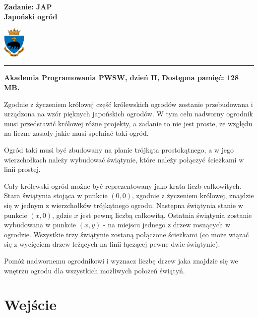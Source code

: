 \documentclass[10pt]{article}
\begin{document}
    

    \noindent
    \begin{minipage}{0.5\textwidth}
        \LARGE{\textsf{\textbf{Zadanie: JAP\\Japoński ogród}}}
    \end{minipage}
    \begin{minipage}{0.5\textwidth}
        \begin{flushright}
            \includegraphics[height=1.5cm]{logo.jpg}
        \end{flushright}
    \end{minipage}
    
    \noindent\rule{\textwidth}{0.4pt}
    
    \noindent\textbf{Akademia Programowania PWSW, dzień II, Dostępna pamięć: 128 MB.}
    \vspace{1em}
    
    
    \noindent
    Zgodnie z życzeniem królowej część królewskich ogrodów zostanie przebudowana i urządzona na wzór pięknych japońskich ogrodów. W tym celu nadworny ogrodnik musi przedstawić królowej różne projekty, a zadanie to nie jest proste, ze względu na liczne zasady jakie musi spełniać taki ogród. 
    
    Ogród taki musi być zbudowany na planie trójkąta prostokątnego, a w jego wierzchołkach należy wybudować świątynie, które należy połączyć ścieżkami w linii prostej.
    
    Cały królewski ogród możne być reprezentowany jako krata liczb całkowitych. Stara świątynia stojąca w punkcie $(0, 0)$, zgodnie z życzeniem królowej, znajdzie się w jednym z wierzchołków trójkątnego ogrodu. Następna świątynia stanie w punkcie $(x, 0)$, gdzie $x$ jest pewną liczbą całkowitą. Ostatnia świątynia zostanie wybudowana w punkcie $(x, y)$ - na miejscu jednego z drzew rosnących w ogrodzie. Wszystkie trzy świątynie zostaną połączone ścieżkami (co może wiązać się z wycięciem drzew leżących na linii łączącej pewne dwie świątynie).
    
    Pomóż nadwornemu ogrodnikowi i wyznacz liczbę drzew jaka znajdzie się we wnętrzu ogrodu dla wszystkich możliwych położeń świątyń.


    \section*{Wejście}
    
\end{document}
